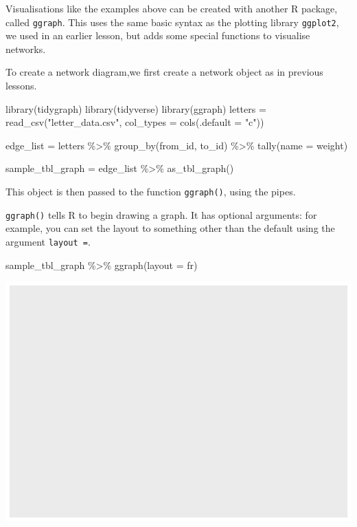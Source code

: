 \documentclass[
]{book}
\newenvironment{Shaded}{\begin{snugshade}}{\end{snugshade}}
\newcommand{\AttributeTok}[1]{\textcolor[rgb]{0.77,0.63,0.00}{#1}}
\newcommand{\FunctionTok}[1]{\textcolor[rgb]{0.00,0.00,0.00}{#1}}
\newcommand{\NormalTok}[1]{#1}
\newcommand{\OtherTok}[1]{\textcolor[rgb]{0.56,0.35,0.01}{#1}}
\newcommand{\SpecialCharTok}[1]{\textcolor[rgb]{0.00,0.00,0.00}{#1}}
\newcommand{\StringTok}[1]{\textcolor[rgb]{0.31,0.60,0.02}{#1}}
\begin{document}
Visualisations like the examples above can be created with another R package, called \texttt{ggraph}. This uses the same basic syntax as the plotting library \texttt{ggplot2}, we used in an earlier lesson, but adds some special functions to visualise networks.

To create a network diagram,we first create a network object as in previous lessons.

\begin{Shaded}
\begin{Highlighting}[]
\FunctionTok{library}\NormalTok{(tidygraph)}
\FunctionTok{library}\NormalTok{(tidyverse)}
\FunctionTok{library}\NormalTok{(ggraph)}
\NormalTok{letters }\OtherTok{=} \FunctionTok{read\_csv}\NormalTok{(}\StringTok{"letter\_data.csv"}\NormalTok{, }\AttributeTok{col\_types =} \FunctionTok{cols}\NormalTok{(}\AttributeTok{.default =} \StringTok{"c"}\NormalTok{))}

\NormalTok{edge\_list }\OtherTok{=}\NormalTok{ letters }\SpecialCharTok{\%\textgreater{}\%} 
  \FunctionTok{group\_by}\NormalTok{(from\_id, to\_id) }\SpecialCharTok{\%\textgreater{}\%} 
  \FunctionTok{tally}\NormalTok{(}\AttributeTok{name =} \StringTok{\textquotesingle{}weight\textquotesingle{}}\NormalTok{)}

\NormalTok{sample\_tbl\_graph }\OtherTok{=}\NormalTok{ edge\_list }\SpecialCharTok{\%\textgreater{}\%} 
  \FunctionTok{as\_tbl\_graph}\NormalTok{()}
\end{Highlighting}
\end{Shaded}

This object is then passed to the function \texttt{ggraph()}, using the pipes.

\texttt{ggraph()} tells R to begin drawing a graph. It has optional arguments: for example, you can set the layout to something other than the default using the argument \texttt{layout\ =}.

\begin{Shaded}
\begin{Highlighting}[]
\NormalTok{sample\_tbl\_graph }\SpecialCharTok{\%\textgreater{}\%} \FunctionTok{ggraph}\NormalTok{(}\AttributeTok{layout =} \StringTok{\textquotesingle{}fr\textquotesingle{}}\NormalTok{)}
\end{Highlighting}
\end{Shaded}

\includegraphics{_main_files/figure-latex/unnamed-chunk-58-1.pdf}
\end{document}
